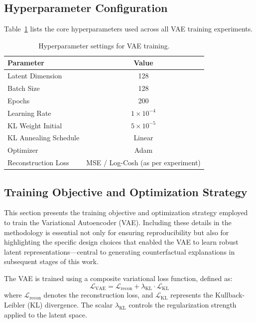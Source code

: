 \subsection{Hyperparameter Configuration} \label{subsec:hyperparameter_config}
Table~\ref{tab:vae_hyperparams} lists the core hyperparameters used across all VAE training experiments.

\begin{table}[h]
    \centering
    \caption{Hyperparameter settings for VAE training.}
    \label{tab:vae_hyperparams}
    \begin{tabular}{|l|c|}
        \hline
        \textbf{Parameter} & \textbf{Value} \\
        \hline
        Latent Dimension & 128 \\
        Batch Size & 128 \\
        Epochs & 200 \\
        Learning Rate & $1 \times 10^{-4}$ \\
        KL Weight Initial & $5 \times 10^{-5}$ \\
        KL Annealing Schedule & Linear \\
        Optimizer & Adam \\
        Reconstruction Loss & MSE / Log-Cosh (as per experiment) \\
        \hline
    \end{tabular}
\end{table}

\subsection{Training Objective and Optimization Strategy} \label{subsec:vae_loss}

This section presents the training objective and optimization strategy employed to train the Variational Autoencoder (VAE). Including these details in the methodology is essential not only for ensuring reproducibility but also for highlighting the specific design choices that enabled the VAE to learn robust latent representations—central to generating counterfactual explanations in subsequent stages of this work.

The VAE is trained using a composite variational loss function, defined as:
\[
\mathcal{L}_{\text{VAE}} = \mathcal{L}_{\text{recon}} + \lambda_{\text{KL}} \cdot \mathcal{L}_{\text{KL}}
\]
where $\mathcal{L}_{\text{recon}}$ denotes the reconstruction loss, and $\mathcal{L}_{\text{KL}}$ represents the Kullback-Leibler (KL) divergence. The scalar $\lambda_{\text{KL}}$ controls the regularization strength applied to the latent space.

